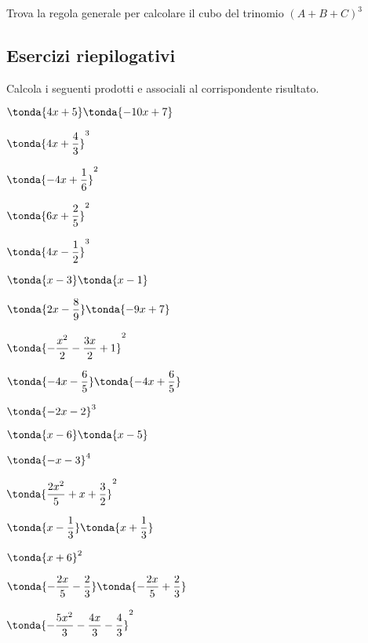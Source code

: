 \begin{esercizio}
\label{ese:11.30}
Trova la regola generale per calcolare il cubo del trinomio
\((A+B+C)^{3}\)
\end{esercizio}


\subsection{Esercizi riepilogativi}

\begin{esercizio}[*]
\label{ese:10.21}
Calcola i seguenti prodotti e associali al corrispondente risultato.
\begin{htmulticols}{3}
\begin{enumeratea}
\spazielenx
\item \(\tonda{4 x + 5}\tonda{- 10 x + 7}\) %
\item \(\tonda{4 x + \dfrac{4}{3}}^{3}\) %
\item \(\tonda{- 4 x + \dfrac{1}{6}}^{2}\) %
\item \(\tonda{6 x + \dfrac{2}{5}}^{2}\) %
\item \(\tonda{4 x - \dfrac{1}{2}}^{3}\) %
\item \(\tonda{x - 3}\tonda{x - 1}\) %
\item \(\tonda{2 x - \dfrac{8}{9}}\tonda{- 9 x + 7}\) %
\item \(\tonda{- \dfrac{x^{2}}{2} - \dfrac{3 x}{2} + 1}^{2}\) %
\item \(\tonda{- 4 x - \dfrac{6}{5}}\tonda{- 4 x + \dfrac{6}{5}}\) %
\item \(\tonda{- 2 x - 2}^{3}\) %
\item \(\tonda{x - 6}\tonda{x - 5}\) %
\item \(\tonda{- x - 3}^{4}\) %
\item \(\tonda{\dfrac{2 x^{2}}{5} + x + \dfrac{3}{2}}^{2}\) %
\item \(\tonda{x - \dfrac{1}{3}}\tonda{x + \dfrac{1}{3}}\) %
\item \(\tonda{x + 6}^{2}\) %
\item \(\tonda{- \dfrac{2 x}{5} - \dfrac{2}{3}}\tonda{- \dfrac{2 x}{5} + 
      \dfrac{2}{3}}\) %
\item \(\tonda{- \dfrac{5 x^{2}}{3} - \dfrac{4 x}{3} - 
      \dfrac{4}{3}}^{2}\) %

\end{enumeratea}
\end{htmulticols}
\end{esercizio}
